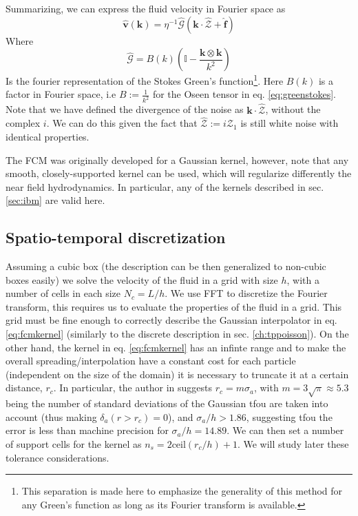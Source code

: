 \documentclass[ twoside,openright,titlepage,numbers=noenddot,%
headinclude,footinclude,cleardoublepage=empty,abstract=on,
BCOR=5mm,paper=a4,fontsize=11pt, dvipsnames
]{scrreprt}
\renewcommand{\vec}[1]{\bm{#1}}
\newcommand{\tens}[1]{\bm{\mathcal{#1}}}
\newcommand{\fou}[1]{\widehat{#1}}
\newcommand{\fvel}{v}
\begin{document}
Summarizing, we can express the fluid velocity in Fourier space as
\begin{equation}
  \label{eq:fcmvel}
  \fou{\vec{\fvel}}(\vec{k}) = \eta^{-1}\hat{\tens{G}}\left(\vec{k}\cdot\fou{\mathcal{Z}} + \fou{\vec{f}}\right)
\end{equation}
Where
\begin{equation}
  \fou{\tens{G}} = B(k)\left(\mathbb{I} - \frac{\vec{k}\otimes\vec{k}}{k^2}\right)
\end{equation}
Is the fourier representation of the Stokes Green's function\footnote{This separation is made here to emphasize the generality of this method for any Green's function as long as its Fourier transform is available.}.
Here $B(k)$ is a factor in Fourier space, i.e $B := \frac{1}{k^2}$ for the Oseen tensor in eq. \eqref{eq:greenstokes}.
Note that we have defined the divergence of the noise as $\vec{k}\cdot\fou{\mathcal{Z}}$, without the complex $i$. We can do this given the fact that $\fou{\mathcal{Z}} := i\fou{\mathcal{Z}}_1$ is still white noise with identical properties.

The \gls{FCM} was originally developed for a Gaussian kernel, however, note that any smooth, closely-supported kernel can be used, which will regularize differently the near field hydrodynamics. In particular, any of the kernels described in sec. \ref{sec:ibm} are valid here.

\subsection*{Spatio-temporal discretization}
Assuming a cubic box (the description can be then generalized to non-cubic boxes easily) we solve the velocity of the fluid in a grid with size $h$, with a number of cells in each size $N_c = L/h$.
We use \gls{FFT} to discretize the Fourier transform, this requires us to evaluate the properties of the fluid in a grid. This grid must be fine enough to correctly describe the Gaussian interpolator in eq. \eqref{eq:fcmkernel} (similarly to the discrete description in sec. \ref{ch:tppoisson}). On the other hand, the kernel in eq. \eqref{eq:fcmkernel} has an infinte range and to make the overall spreading/interpolation have a constant cost for each particle (independent on the size of the domain) it is necessary to truncate it at a certain distance, $r_c$. In particular, the author in \cite{Keaveny2014} suggests $r_c=m \sigma_a$, with $m=3\sqrt{\pi}\approx 5.3$ being the number of standard deviations of the Gaussian tfou are taken into account (thus making $\delta_a(r>r_c) = 0$), and $\sigma_a/h > 1.86$, suggesting tfou the error is less than machine precision for $\sigma_a/h = 14.89$. We can then set a number of support cells for the kernel as $n_s = 2 \textrm{ceil}(r_c/h)+1$.
We will study later these tolerance considerations.
\end{document}
